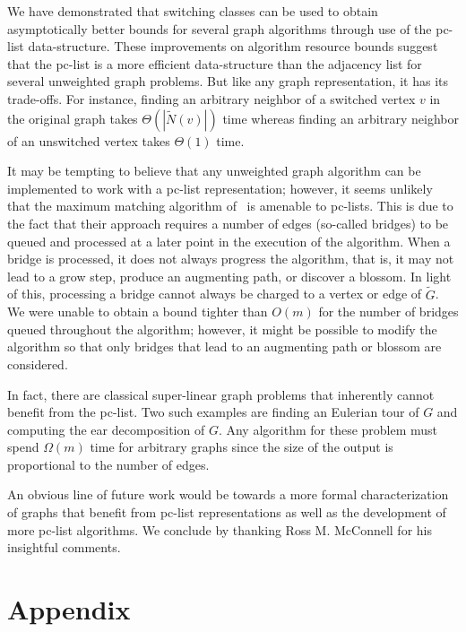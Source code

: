 \documentclass{llncs}
\begin{document}
We have demonstrated that switching classes can be used to obtain asymptotically better bounds for several graph algorithms through use of the pc-list data-structure.  These improvements on algorithm resource bounds suggest that the pc-list is a more efficient data-structure than the adjacency list for several unweighted graph problems.  But like any graph representation, it has its trade-offs.  For instance, finding an arbitrary neighbor of a switched vertex $v$ in the original graph takes $\Theta(|\widetilde{N}(v)|)$ time whereas finding an arbitrary neighbor of an unswitched vertex takes $\Theta(1)$ time.

It may be tempting to believe that any unweighted graph algorithm can be implemented to work with a pc-list representation; however, it seems unlikely that the maximum matching algorithm of~\cite{MicaliV80} is amenable to pc-lists.  This is due to the fact that their approach requires a number of edges (so-called bridges) to be queued and processed at a later point in the execution of the algorithm.  When a bridge is processed, it does not always progress the algorithm, that is, it may not lead to a grow step, produce an augmenting path, or discover a blossom.  In light of this, processing a bridge cannot always be charged to a vertex or edge of $\widetilde{G}$.  We were unable to obtain a bound tighter than $O(m)$ for the number of bridges queued throughout the algorithm; however, it might be possible to modify the algorithm so that only bridges that lead to an augmenting path or blossom are considered.

In fact, there are classical super-linear graph problems that inherently cannot benefit from the pc-list.  Two such examples are finding an Eulerian tour of $G$ and computing the ear decomposition of $G$.  Any algorithm for these problem must spend $\Omega(m)$ time for arbitrary graphs since the size of the output is proportional to the number of edges.

An obvious line of future work would be towards a more formal characterization of graphs that benefit from pc-list representations as well as the development of more pc-list algorithms.  We conclude by thanking Ross M. McConnell for his insightful comments.








\section{Appendix}
\end{document}
